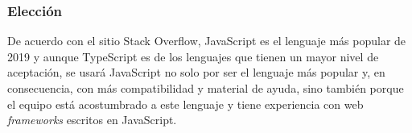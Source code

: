 \subsubsection*{Elección}

De acuerdo con el sitio Stack Overflow\cite{noauthor_stack_nodate}, JavaScript es el lenguaje más popular de 2019 y aunque TypeScript es de los lenguajes que tienen un mayor nivel de aceptación, se usará JavaScript no solo por ser el lenguaje más popular y, en consecuencia, con más compatibilidad y material de ayuda, sino también porque el equipo está acostumbrado a este lenguaje y tiene experiencia con web \textit{frameworks} escritos en JavaScript.

